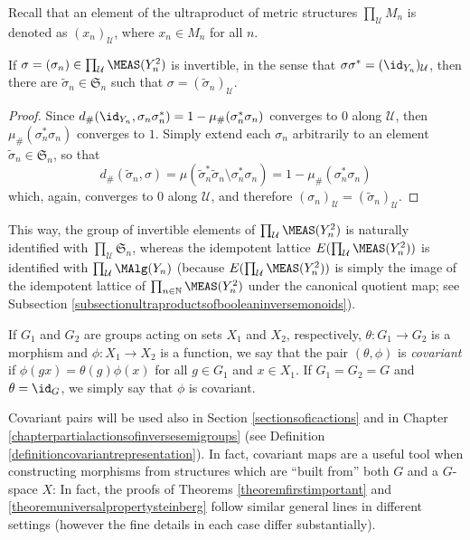 Recall that an element of the ultraproduct of metric structures $\prod_\mathcal{U}M_n$ is denoted as $(x_n)_\mathcal{U}$, where $x_n\in M_n$ for all $n$.

\begin{lemma}\label{lemmainvertibleinultraproduct}
If $\sigma=(\sigma_n)\in\prod_\mathcal{U}\MEAS(Y_n^2)$ is invertible, in the sense that $\sigma\sigma^*=(\id_{Y_n})_{\mathcal{U}}$, then there are $\widetilde{\sigma}_n\in\mathfrak{S}_n$ such that $\sigma=(\widetilde{\sigma}_n)_\mathcal{U}$.
\end{lemma}
\begin{proof}
Since $d_\#(\id_{Y_n},\sigma_n\sigma_n^*)=1-\mu_\#(\sigma_n^*\sigma_n)$ converges to $0$ along $\mathcal{U}$, then $\mu_\#(\sigma_n^*\sigma_n)$ converges to $1$. Simply extend each $\sigma_n$ arbitrarily to an element $\widetilde{\sigma}_n\in\mathfrak{S}_n$, so that
\[d_\#(\widetilde{\sigma}_n,\sigma)=\mu(\widetilde{\sigma}_n^*\widetilde{\sigma}_n\setminus\sigma_n^*\sigma_n)=1-\mu_\#(\sigma_n^*\sigma_n)\]
which, again, converges to $0$ along $\mathcal{U}$, and therefore $(\sigma_n)_\mathcal{U}=(\widetilde{\sigma}_n)_\mathcal{U}$.\qedhere
\end{proof}

This way, the group of invertible elements of $\prod_\mathcal{U}\MEAS(Y_n^2)$ is naturally identified with $\prod_\mathcal{U}\mathfrak{S}_n$, whereas the idempotent lattice $E(\prod_\mathcal{U}\MEAS(Y_n^2))$ is identified with $\prod_\mathcal{U}\MAlg(Y_n)$ (because $E(\prod_\mathcal{U}\MEAS(Y_n^2))$ is simply the image of the idempotent lattice of $\prod_{n\in\mathbb{N}}\MEAS(Y_n^2)$ under the canonical quotient map; see Subsection \ref{subsectionultraproductsofbooleaninversemonoids}).

\begin{definition}\label{definitioncovariant}
If $G_1$ and $G_2$ are groups acting on sets $X_1$ and $X_2$, respectively, $\theta:G_1\to G_2$ is a morphism and $\phi:X_1\to X_2$ is a function, we say that the pair $(\theta,\phi)$ is \emph{covariant} if $\phi(g x)=\theta(g)\phi(x)$ for all $g\in G_1$ and $x\in X_1$. If $G_1=G_2=G$ and $\theta=\id_G$, we simply say that  $\phi$ is covariant.
\end{definition}

\begin{remark}
Covariant pairs will be used also in Section \ref{sectionsoficactions} and in Chapter \ref{chapterpartialactionsofinversesemigroups} (see Definition \ref{definitioncovariantrepresentation}). In fact, covariant maps are a useful tool when constructing morphisms from structures which are ``built from'' both $G$ and a $G$-space $X$: In fact, the proofs of Theorems \ref{theoremfirstimportant} and \ref{theoremuniversalpropertysteinberg} follow similar general lines in different settings (however the fine details in each case differ substantially).
\end{remark}

